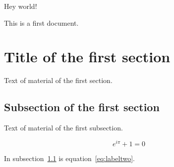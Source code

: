 \documentclass{article}
\begin{document}
	Hey world!
	
	This is a first document.
	
	\section{Title of the first section}
	
	Text of material of the first section.
	
	\subsection{Subsection of the first section}
	\label{subsec:labelone}
	
	Text of material of the first subsection.
	
	\begin{equation}
		e^{i\pi} + 1 = 0
		\label{eq:labeltwo}
	\end{equation}
	
	In subsection~\ref{subsec:labelone} is equation~\ref{eq:labeltwo}.
\end{document}
